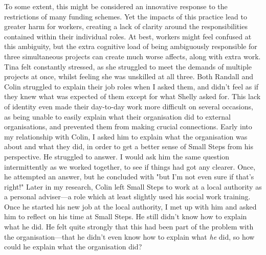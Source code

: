 To some extent, this might be considered an innovative response to the restrictions of many funding schemes. Yet the impacts of this practice lead to greater harm for workers, creating a lack of clarity around the responsibilities contained within their individual roles. At best, workers might feel confused at this ambiguity, but the extra cognitive load of being ambiguously responsible for three simultaneous projects can create much worse affects, along with extra work. Tina felt constantly stressed, as she struggled to meet the demands of multiple projects at once, whilst feeling she was unskilled at all three. Both Randall and Colin struggled to explain their job roles when I asked them, and didn't feel as if they knew what was expected of them except for what Shelly asked for. This lack of identity even made their day-to-day work more difficult on several occasions, as being unable to easily explain what their organisation did to external organisations, and prevented them from making crucial connections. Early into my relationship with Colin, I asked him to explain what the organisation was about and what they did, in order to get a better sense of  Small Steps from his perspective. He struggled to answer. I would ask him the same question intermittently as we worked together, to see if things had got any clearer. Once, he attempted an answer, but he concluded with "but I’m not even sure if that’s right!" Later in my research, Colin left Small Steps to work at a local authority as a personal adviser—a role which at least slightly used his social work training. Once he started his new job at the local authority, I met up with him and asked him to reflect on his time at Small Steps. He still didn't know how to explain what he did. He felt quite strongly that this had been part of the problem with the organisation—that he didn't even know how to explain what \emph{he} did, so how could he explain what the organisation did? 


